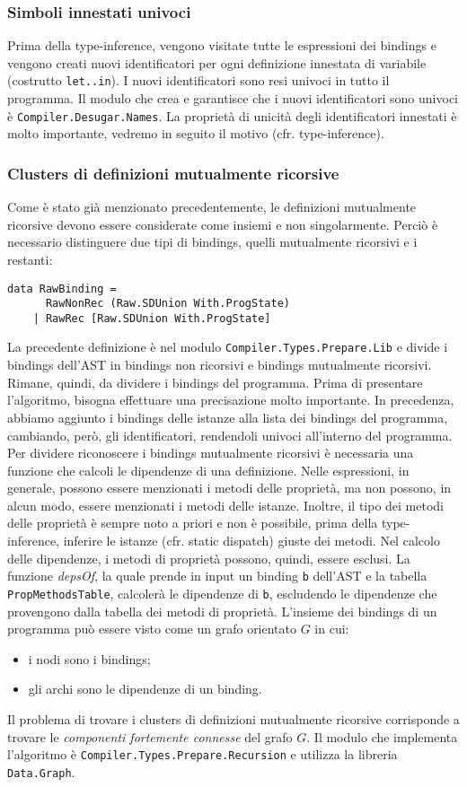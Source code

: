 \documentclass[10pt,a4paper]{article}
\begin{document}
\subsubsection{Simboli innestati univoci}
Prima della type-inference, vengono visitate tutte le espressioni dei bindings e vengono creati nuovi identificatori
per ogni definizione innestata di variabile (costrutto \texttt{let..in}). I nuovi identificatori sono resi univoci in
tutto il programma. Il modulo che crea e garantisce che i nuovi identificatori sono univoci è
\texttt{Compiler.Desugar.Names}. La proprietà di unicità degli identificatori innestati è molto importante, vedremo in
seguito il motivo (cfr. type-inference).

\subsubsection{Clusters di definizioni mutualmente ricorsive}
Come è stato già menzionato precedentemente, le definizioni mutualmente ricorsive devono essere considerate come insiemi
e non singolarmente. Perciò è necessario distinguere due tipi di bindings, quelli mutualmente ricorsivi e i restanti:
\begin{lstlisting}
data RawBinding =
      RawNonRec (Raw.SDUnion With.ProgState)
    | RawRec [Raw.SDUnion With.ProgState]
\end{lstlisting}
La precedente definizione è nel modulo \texttt{Compiler.Types.Prepare.Lib} e divide i bindings dell'AST in bindings
non ricorsivi e bindings mutualmente ricorsivi. Rimane, quindi, da dividere i bindings del programma. Prima di presentare
l'algoritmo, bisogna effettuare una precisazione molto importante. In precedenza, abbiamo aggiunto i bindings delle
istanze alla lista dei bindings del programma, cambiando, però, gli identificatori, rendendoli univoci all'interno del
programma. Per dividere riconoscere i bindings mutualmente ricorsivi è necessaria una funzione che calcoli le dipendenze
di una definizione. Nelle espressioni, in generale, possono essere menzionati i metodi delle proprietà, ma non possono,
in alcun modo, essere menzionati i metodi delle istanze. Inoltre, il tipo dei metodi delle proprietà è sempre noto a
priori e non è possibile, prima della type-inference, inferire le istanze (cfr. static dispatch) giuste dei metodi.
Nel calcolo delle dipendenze, i metodi di proprietà possono, quindi, essere esclusi. La funzione \textit{depsOf}, la quale
prende in input un binding \texttt{b} dell'AST e la tabella \texttt{PropMethodsTable}, calcolerà le dipendenze di
\texttt{b}, escludendo le dipendenze che provengono dalla tabella dei metodi di proprietà. L'insieme dei bindings di
un programma può essere visto come un grafo orientato $ G $ in cui:
\begin{itemize}
    \item i nodi sono i bindings;
    \item gli archi sono le dipendenze di un binding.
\end{itemize}
Il problema di trovare i clusters di definizioni mutualmente ricorsive corrisponde a trovare le \textit{componenti
fortemente connesse} del grafo $ G $. Il modulo che implementa l'algoritmo è \texttt{Compiler.Types.Prepare.Recursion}
e utilizza la libreria \texttt{Data.Graph}.
\end{document}
